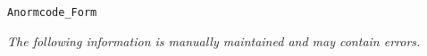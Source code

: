 \label{pkg:anormcode\_form}
\begin{verbatim}
Anormcode_Form
\end{verbatim}
{\tiny\it The following information is manually maintained and may contain errors.}

